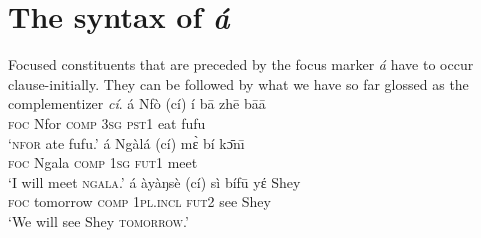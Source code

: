 \documentclass[output=paper,
modfonts
]{langscibook}
\begin{document}
\ea  \label{ex:becker:uni1}
\settowidth{}
\z \z 

\ea  \label{ex:becker:uni2}
\settowidth{}
\z \z 


\section{The syntax of \textit{\'a}}\label{sec:becker:syntax}
Focused constituents that are preceded by the focus marker {\em \'a} have to occur clause-initially. They can be followed by what we have so far glossed as the complementizer {\em c\'i}.
\ea
\settowidth{}
\ea \label{ex:becker:s7}
\gll \'{a} {Nf\`{o}} (c\'{i}) \'{i} b\=a zh\=e b\=a\=a\\  
     \textsc{foc} {Nfor} \textsc{comp} \textsc{3sg} \textsc{pst1} eat fufu\\ 
\glt `\textsc{\MakeLowercase{NFOR}} ate fufu.'
\ex \label{ex:becker:s8}
\gll \'{a} {Ng\`{a}l\'{a}} (c\'{i}) m\`ɛ b\'{i} k\=ɔn\={\i}\\  
     \textsc{foc} {Ngala} \textsc{comp} \textsc{1sg} \textsc{fut1} meet\\ 
\glt `I will meet \textsc{\MakeLowercase{NGALA}}.'
\ex \label{ex:becker:s9}
\gll \'a {\`ay\`aŋs\`e} (c\'i) s\`i b\'if\=u y{\'{ε}} Shey\\  
     \textsc{foc} {tomorrow} \textsc{comp} \textsc{1pl.incl}  \textsc{fut2} see Shey\\ 
\glt `We will see Shey \textsc{\MakeLowercase{TOMORROW}}.'
\z \z
\end{document}
